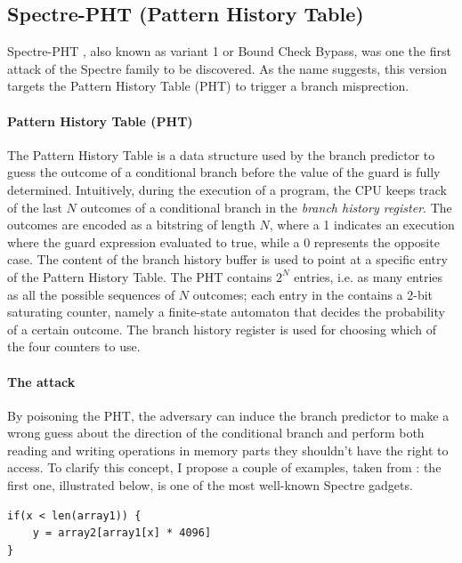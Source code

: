 \documentclass[12pt,a4paper]{book}
\theoremstyle{definition}
\begin{document}
	\subsection{Spectre-PHT (Pattern History Table)}\label{sec:spectre-pht}
	Spectre-PHT \cite{Kocher2019}\cite{Canella2019}\cite{Evtyushkin2018}, also known as variant 1 or Bound Check Bypass, was one the first attack of the Spectre family to be discovered. As the name suggests, this version targets the Pattern History Table (PHT) to trigger a branch misprection.
	\paragraph{Pattern History Table (PHT)} The Pattern History Table \cite{Fog2021} is a data structure used by the branch predictor to guess the outcome of a conditional branch before the value of the guard is fully determined. Intuitively, during the execution of a program, the CPU keeps track of the last $N$ outcomes of a conditional branch in the \textit{branch history register}. The outcomes are encoded as a bitstring of length $N$, where a 1 indicates an execution where the guard expression evaluated to true, while a 0 represents the opposite case. The content of the branch history buffer is used to point at a specific entry of the Pattern History Table. The PHT contains $2^N$ entries, i.e. as many entries as all the possible sequences of $N$ outcomes; each entry in
	the contains a 2-bit saturating counter, namely a finite-state automaton that decides the probability of a certain outcome. The branch history register is used for choosing which of the four counters to use.
	
	\paragraph{The attack} By poisoning the PHT, the adversary can induce the branch predictor to make a wrong guess about the direction of the conditional branch and perform both reading and writing operations in memory parts they shouldn't have the right to access. To clarify this concept, I propose a couple of examples, taken from \cite{Canella2019}: the first one, illustrated below, is one of the most well-known Spectre gadgets.
	
	\vspace{3mm}
	\begin{minipage}{.5\textwidth}
	\begin{lstlisting}
if(x < len(array1)) {
	y = array2[array1[x] * 4096]
}
	\end{lstlisting}
	\end{minipage}
	
\end{document}
